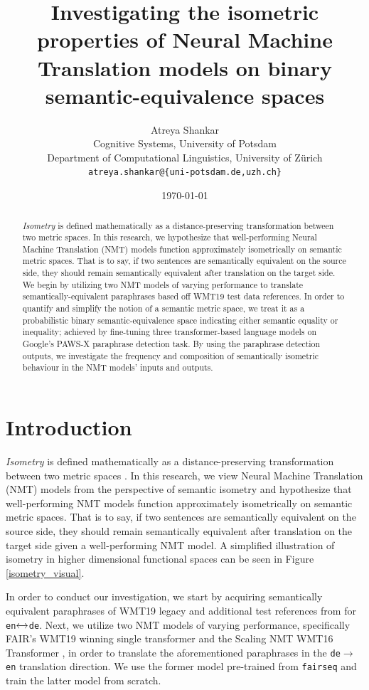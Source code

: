\documentclass[11pt,a4paper]{article}
\title{Investigating the isometric properties of Neural Machine Translation models on binary semantic-equivalence spaces}
\author{Atreya Shankar \\
  Cognitive Systems, University of Potsdam \\
  Department of Computational Linguistics, University of Zürich \\
  \texttt{atreya.shankar@\{uni-potsdam.de,uzh.ch\}}}
\date{\today}
\begin{document}
\maketitle

\begin{abstract}
  \textit{Isometry} is defined mathematically as a distance-preserving transformation between two metric spaces. In this research, we hypothesize that well-performing Neural Machine Translation (NMT) models function approximately isometrically on semantic metric spaces. That is to say, if two sentences are semantically equivalent on the source side, they should remain semantically equivalent after translation on the target side. We begin by utilizing two NMT models of varying performance to translate semantically-equivalent paraphrases based off WMT19 test data references. In order to quantify and simplify the notion of a semantic metric space, we treat it as a probabilistic binary semantic-equivalence space indicating either semantic equality or inequality; achieved by fine-tuning three transformer-based language models on Google's PAWS-X paraphrase detection task. By using the paraphrase detection outputs, we investigate the frequency and composition of semantically isometric behaviour in the NMT models' inputs and outputs.
\end{abstract}

\section{Introduction}

\textit{Isometry} is defined mathematically as a distance-preserving transformation between two metric spaces \cite{coxeter1961introduction}. In this research, we view Neural Machine Translation (NMT) models from the perspective of semantic isometry and hypothesize that well-performing NMT models function approximately isometrically on semantic metric spaces. That is to say, if two sentences are semantically equivalent on the source side, they should remain semantically equivalent after translation on the target side given a well-performing NMT model. A simplified illustration of isometry in higher dimensional functional spaces can be seen in Figure \ref{isometry_visual}.

In order to conduct our investigation, we start by acquiring semantically equivalent paraphrases of WMT19 legacy and additional test references from \citet{freitag-bleu-paraphrase-references-2020} for \texttt{en$\xleftrightarrow{}$de}. Next, we utilize two NMT models of varying performance, specifically FAIR's WMT19 winning single transformer \cite{ng2019facebook} and the Scaling NMT WMT16 Transformer \cite{ott2018scaling}, in order to translate the aforementioned paraphrases in the \texttt{de$\rightarrow$en} translation direction. We use the former model pre-trained from \texttt{fairseq} and train the latter model from scratch.
\end{document}
